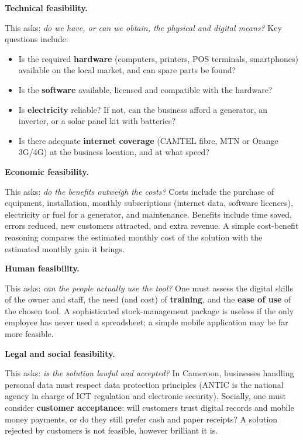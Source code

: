 \documentclass[11pt]{article}
\newcommand{\cle}[1]{{\popxbold\color{popdark}#1}}
\begin{document}
\textbf{Technical feasibility.}\par
This asks: \emph{do we have, or can we obtain, the physical and digital means?} Key questions include:
\begin{itemize}
\item Is the required \textbf{hardware} (computers, printers, POS terminals, smartphones) available on the local market, and can spare parts be found?
\item Is the \textbf{software} available, licensed and compatible with the hardware?
\item Is \textbf{electricity} reliable? If not, can the business afford a generator, an inverter, or a solar panel kit with batteries?
\item Is there adequate \textbf{internet coverage} (CAMTEL fibre, MTN or Orange 3G/4G) at the business location, and at what speed?
\end{itemize}

\textbf{Economic feasibility.}\par
This asks: \emph{do the benefits outweigh the costs?} Costs include the purchase of equipment, installation, monthly subscriptions (internet data, software licences), electricity or fuel for a generator, and maintenance. Benefits include time saved, errors reduced, new customers attracted, and extra revenue. A simple \cle{cost-benefit reasoning} compares the estimated monthly cost of the solution with the estimated monthly gain it brings.

\textbf{Human feasibility.}\par
This asks: \emph{can the people actually use the tool?} One must assess the digital skills of the owner and staff, the need (and cost) of \textbf{training}, and the \textbf{ease of use} of the chosen tool. A sophisticated stock-management package is useless if the only employee has never used a spreadsheet; a simple mobile application may be far more feasible.

\textbf{Legal and social feasibility.}\par
This asks: \emph{is the solution lawful and accepted?} In Cameroon, businesses handling personal data must respect data protection principles (ANTIC is the national agency in charge of ICT regulation and electronic security). Socially, one must consider \textbf{customer acceptance}: will customers trust digital records and mobile money payments, or do they still prefer cash and paper receipts? A solution rejected by customers is not feasible, however brilliant it is.
\end{document}
